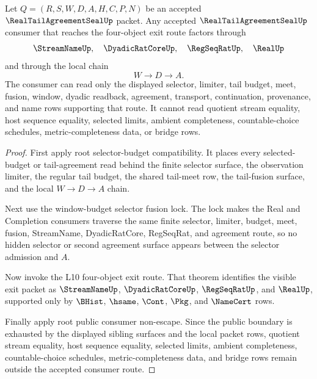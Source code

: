 \begin{theorem}
\label{thm:real-tail-agreement-seal-four-object-exit-nonescape}
Let $Q=(R,S,W,D,A,H,C,P,N)$ be an accepted $\RealTailAgreementSealUp$ packet. Any accepted $\RealTailAgreementSealUp$ consumer that reaches the four-object exit route factors through
$$
\StreamNameUp,\quad \DyadicRatCoreUp,\quad \RegSeqRatUp,\quad \RealUp
$$
and through the local chain
$$
W \to D \to A.
$$
The consumer can read only the displayed selector, limiter, tail budget, meet, fusion, window, dyadic readback, agreement, transport, continuation, provenance, and name rows supporting that route. It cannot read quotient stream equality, host sequence equality, selected limits, ambient completeness, countable-choice schedules, metric-completeness data, or bridge rows.
\end{theorem}
\begin{proof}
First apply root selector-budget compatibility. It places every selected-budget or tail-agreement read behind the finite selector surface, the observation limiter, the regular tail budget, the shared tail-meet row, the tail-fusion surface, and the local $W \to D \to A$ chain.

Next use the window-budget selector fusion lock. The lock makes the Real and Completion consumers traverse the same finite selector, limiter, budget, meet, fusion, StreamName, DyadicRatCore, RegSeqRat, and agreement route, so no hidden selector or second agreement surface appears between the selector admission and $A$.

Now invoke the L10 four-object exit route. That theorem identifies the visible exit packet as $\StreamNameUp$, $\DyadicRatCoreUp$, $\RegSeqRatUp$, and $\RealUp$, supported only by $\BHist$, $\hsame$, $\Cont$, $\Pkg$, and $\NameCert$ rows.

Finally apply root public consumer non-escape. Since the public boundary is exhausted by the displayed sibling surfaces and the local packet rows, quotient stream equality, host sequence equality, selected limits, ambient completeness, countable-choice schedules, metric-completeness data, and bridge rows remain outside the accepted consumer route.
\end{proof}
